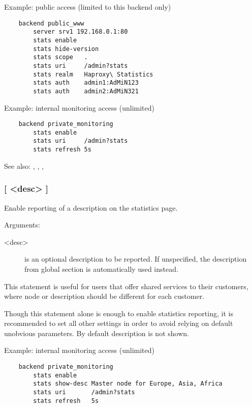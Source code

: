   Example: public access (limited to this backend only)
  \begin{verbatim}
    backend public_www
        server srv1 192.168.0.1:80
        stats enable
        stats hide-version
        stats scope   .
        stats uri     /admin?stats
        stats realm   Haproxy\ Statistics
        stats auth    admin1:AdMiN123
        stats auth    admin2:AdMiN321
  \end{verbatim}

  Example: internal monitoring access (unlimited)
  \begin{verbatim}
    backend private_monitoring
        stats enable
        stats uri     /admin?stats
        stats refresh 5s
  \end{verbatim}


See also: , , , 

\subsubsection[stats show-desc]{ [ <desc> ]}


  Enable reporting of a description on the statistics page.


   Arguments:
   \begin{description}
    \item[<desc>]    is an optional description to be reported. If unspecified, the
              description from global section is automatically used instead.
   \end{description}

  This statement is useful for users that offer shared services to their
  customers, where node or description should be different for each customer.

  Though this statement alone is enough to enable statistics reporting, it is
  recommended to set all other settings in order to avoid relying on default
  unobvious parameters.  By default description is not shown.

  Example: internal monitoring access (unlimited)
  \begin{verbatim}
    backend private_monitoring
        stats enable
        stats show-desc Master node for Europe, Asia, Africa
        stats uri       /admin?stats
        stats refresh   5s
  \end{verbatim}


